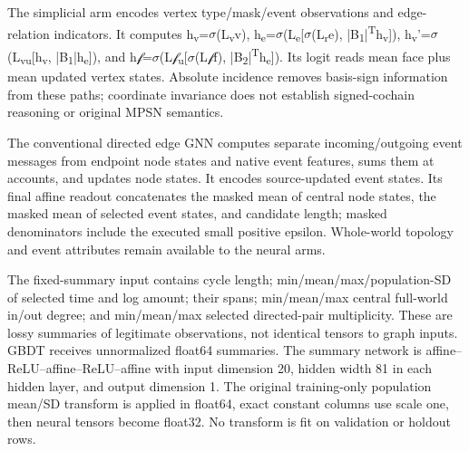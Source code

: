 \documentclass{article}
\begin{document}
The simplicial arm encodes vertex type/mask/event observations and edge-relation indicators. It computes h\textsubscript{v}=\(\sigma\)(L\textsubscript{v}v), h\textsubscript{e}=\(\sigma\)(L\textsubscript{e}[\(\sigma\)(L\textsubscript{r}e), |B\textsubscript{1}|\textsuperscript{T}h\textsubscript{v}]), h\textsubscript{v}'=\(\sigma\)(L\textsubscript{v}\textsubscript{u}[h\textsubscript{v}, |B\textsubscript{1}|h\textsubscript{e}]), and h\(\mathcal{f}\)=\(\sigma\)(L\(\mathcal{f}\)\textsubscript{u}[\(\sigma\)(L\(\mathcal{f}\)f), |B\textsubscript{2}|\textsuperscript{T}h\textsubscript{e}]). Its logit reads mean face plus mean updated vertex states. Absolute incidence removes basis-sign information from these paths; coordinate invariance does not establish signed-cochain reasoning or original MPSN semantics.

The conventional directed edge GNN computes separate incoming/outgoing event messages from endpoint node states and native event features, sums them at accounts, and updates node states. It encodes source-updated event states. Its final affine readout concatenates the masked mean of central node states, the masked mean of selected event states, and candidate length; masked denominators include the executed small positive epsilon. Whole-world topology and event attributes remain available to the neural arms.

The fixed-summary input contains cycle length; min/mean/max/population-SD of selected time and log amount; their spans; min/mean/max central full-world in/out degree; and min/mean/max selected directed-pair multiplicity. These are lossy summaries of legitimate observations, not identical tensors to graph inputs. GBDT receives unnormalized float64 summaries. The summary network is affine--ReLU--affine--ReLU--affine with input dimension 20, hidden width 81 in each hidden layer, and output dimension 1. The original training-only population mean/SD transform is applied in float64, exact constant columns use scale one, then neural tensors become float32. No transform is fit on validation or holdout rows.
\end{document}
